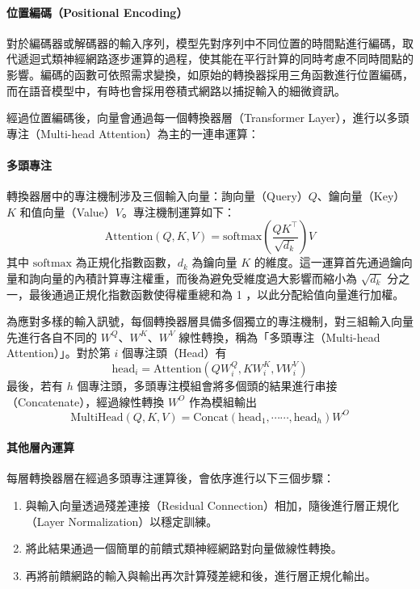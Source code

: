 \paragraph{位置編碼（Positional Encoding）}

對於編碼器或解碼器的輸入序列，模型先對序列中不同位置的時間點進行編碼，取代遞迴式類神經網路逐步運算的過程，使其能在平行計算的同時考慮不同時間點的影響。編碼的函數可依照需求變換，如原始的轉換器採用三角函數進行位置編碼，而在語音模型中，有時也會採用卷積式網路以捕捉輸入的細微資訊。

經過位置編碼後，向量會通過每一個轉換器層（Transformer Layer），進行以多頭專注（Multi-head Attention）為主的一連串運算：

\paragraph{多頭專注}

轉換器層中的專注機制涉及三個輸入向量：詢向量（Query）$Q$、鑰向量（Key）$K$ 和值向量（Value）$V$。專注機制運算如下：
\[
\text{Attention}(Q, K, V) = \text{softmax}
\left(
\frac{QK^\top}{\sqrt{d_k}}
\right)
V
\]
其中 $\text{softmax}$ 為正規化指數函數，$d_k$ 為鑰向量 $K$ 的維度。這一運算首先通過鑰向量和詢向量的內積計算專注權重，而後為避免受維度過大影響而縮小為 $\sqrt{d_k}$ 分之一，最後通過正規化指數函數使得權重總和為 1 ，以此分配給值向量進行加權。

為應對多樣的輸入訊號，每個轉換器層具備多個獨立的專注機制，對三組輸入向量先進行各自不同的 $W^Q$、$W^K$、$W^V$ 線性轉換，稱為「多頭專注（Multi-head Attention）」。對於第 $i$ 個專注頭（Head）有
\[
\text{head}_i = \text{Attention}(QW^Q_i,KW^K_i,VW^V_i)
\]
最後，若有 $h$ 個專注頭，多頭專注模組會將多個頭的結果進行串接（Concatenate），經過線性轉換 $W^O$ 作為模組輸出
\[
\text{MultiHead}(Q, K, V) = \text{Concat}(\text{head}_1, \cdots\cdots, \text{head}_h) W^O
\]

\paragraph{其他層內運算}

每層轉換器層在經過多頭專注運算後，會依序進行以下三個步驟：

\begin{enumerate}
\item 與輸入向量透過殘差連接（Residual Connection）相加，隨後進行層正規化（Layer Normalization）以穩定訓練。
\item 將此結果通過一個簡單的前饋式類神經網路對向量做線性轉換。
\item 再將前饋網路的輸入與輸出再次計算殘差總和後，進行層正規化輸出。
\end{enumerate}

